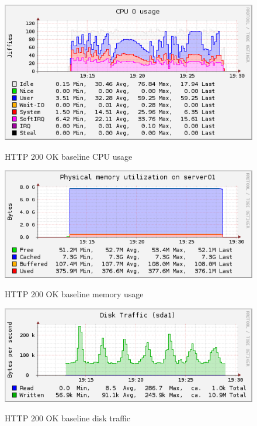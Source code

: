 \documentclass[Measurements]{subfiles}
\begin{document}
\begin{figure}[H]
\centering
\caption{HTTP 200 OK baseline CPU usage}
\includegraphics[scale=0.7]{images/results/200_with_naxsi_incremented_disallowed_parameters/cpu.png}
\label{fig:Baseline Nginx CPU usage}
\end{figure}

\begin{figure}[H]
\centering
\caption{HTTP 200 OK baseline memory usage}
\includegraphics[scale=0.7]{images/results/200_with_naxsi_incremented_disallowed_parameters/memory.png}
\label{fig:Baseline Nginx memory usage}
\end{figure}

\begin{figure}[H]
\centering
\caption{HTTP 200 OK baseline disk traffic}
\includegraphics[scale=0.7]{images/results/200_with_naxsi_incremented_disallowed_parameters/disk.png}
\label{fig:Baseline Nginx disk traffic}
\end{figure}
\end{document}
